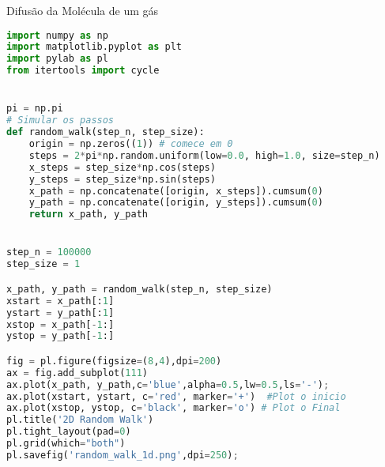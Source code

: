 Difusão da Molécula de um gás

\begin{lstlisting}[language=Python, frame=lines,basicstyle=\footnotesize, caption={Difusão da Molécula de Um Gás em 2D}, label={lst:Diffusion}]
import numpy as np
import matplotlib.pyplot as plt
import pylab as pl
from itertools import cycle


pi = np.pi
# Simular os passos
def random_walk(step_n, step_size):
    origin = np.zeros((1)) # comece em 0
    steps = 2*pi*np.random.uniform(low=0.0, high=1.0, size=step_n)
    x_steps = step_size*np.cos(steps)
    y_steps = step_size*np.sin(steps)
    x_path = np.concatenate([origin, x_steps]).cumsum(0)
    y_path = np.concatenate([origin, y_steps]).cumsum(0)
    return x_path, y_path


step_n = 100000
step_size = 1

x_path, y_path = random_walk(step_n, step_size)
xstart = x_path[:1]
ystart = y_path[:1]
xstop = x_path[-1:]
ystop = y_path[-1:]

fig = pl.figure(figsize=(8,4),dpi=200)
ax = fig.add_subplot(111)
ax.plot(x_path, y_path,c='blue',alpha=0.5,lw=0.5,ls='-');
ax.plot(xstart, ystart, c='red', marker='+')  #Plot o inicio
ax.plot(xstop, ystop, c='black', marker='o') # Plot o Final
pl.title('2D Random Walk')
pl.tight_layout(pad=0)
pl.grid(which="both")
pl.savefig('random_walk_1d.png',dpi=250);

\end{lstlisting}

